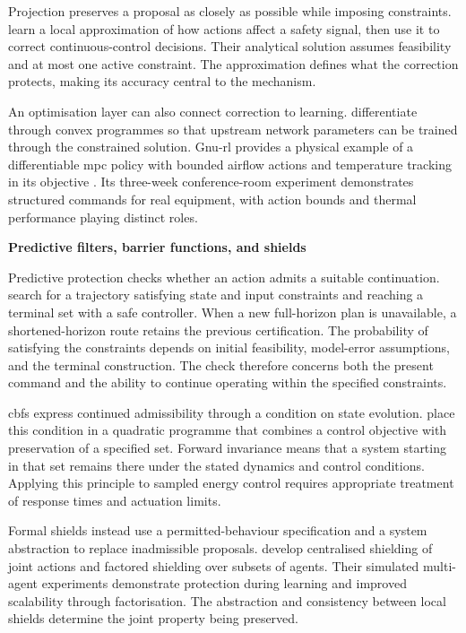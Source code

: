 Projection preserves a proposal as closely as possible while imposing constraints. \textcite{dalal2018safe} learn a local approximation of how actions affect a safety signal, then use it to correct continuous-control decisions. Their analytical solution assumes feasibility and at most one active constraint. The approximation defines what the correction protects, making its accuracy central to the mechanism.

An optimisation layer can also connect correction to learning. \textcite{agrawal2019differentiable} differentiate through convex programmes so that upstream network parameters can be trained through the constrained solution. Gnu-\gls{rl} provides a physical example of a differentiable \gls{mpc} policy with bounded airflow actions and temperature tracking in its objective \parencite{chen2020gnurl}. Its three-week conference-room experiment demonstrates structured commands for real equipment, with action bounds and thermal performance playing distinct roles.

\smallskip
\noindent\textbf{Predictive filters, barrier functions, and shields}\par\nobreak\smallskip
Predictive protection checks whether an action admits a suitable continuation. \textcite{wabersich2021predictive} search for a trajectory satisfying state and input constraints and reaching a terminal set with a safe controller. When a new full-horizon plan is unavailable, a shortened-horizon route retains the previous certification. The probability of satisfying the constraints depends on initial feasibility, model-error assumptions, and the terminal construction. The check therefore concerns both the present command and the ability to continue operating within the specified constraints.

\glspl{cbf} express continued admissibility through a condition on state evolution. \textcite{ames2017cbf} place this condition in a quadratic programme that combines a control objective with preservation of a specified set. Forward invariance means that a system starting in that set remains there under the stated dynamics and control conditions. Applying this principle to sampled energy control requires appropriate treatment of response times and actuation limits.

Formal shields instead use a permitted-behaviour specification and a system abstraction to replace inadmissible proposals. \textcite{elsayedaly2021shielding} develop centralised shielding of joint actions and factored shielding over subsets of agents. Their simulated multi-agent experiments demonstrate protection during learning and improved scalability through factorisation. The abstraction and consistency between local shields determine the joint property being preserved.


